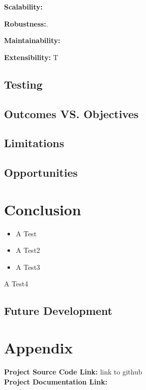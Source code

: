 \par \textbf{Scalability:} 

\par \textbf{Robustness:}.

\par \textbf{Maintainability:}

\par \textbf{Extensibility:} T

\section{Testing}

\section{Outcomes VS. Objectives}

\section{Limitations}

\section{Opportunities}

\chapter{Conclusion}


\begin{itemize}
\item A Test

\item A Test2
\item A Test3
\end{itemize}
A Test4
\section{Future Development}

\chapter{Appendix}

\textbf{Project Source Code Link: }link to github \\
\textbf{Project Documentation Link: } \\

